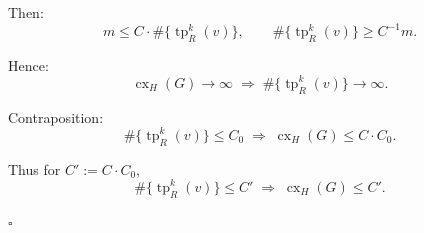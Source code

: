 Then:
\[
m \le C\cdot \#\{\operatorname{tp}^k_R(v)\},
\qquad
\#\{\operatorname{tp}^k_R(v)\}\ge C^{-1} m.
\]

Hence:
\[
\operatorname{cx}_H(G)\to\infty
\;\Longrightarrow\;
\#\{\operatorname{tp}^k_R(v)\}\to\infty.
\]

Contraposition:
\[
\#\{\operatorname{tp}^k_R(v)\}\le C_0
\;\Longrightarrow\;
\operatorname{cx}_H(G)\le C\cdot C_0.
\]

Thus for \(C' := C\cdot C_0\),
\[
\#\{\operatorname{tp}^k_R(v)\}\le C'
\;\Longrightarrow\;
\operatorname{cx}_H(G)\le C'.
\]

\hfill\(\square\)

